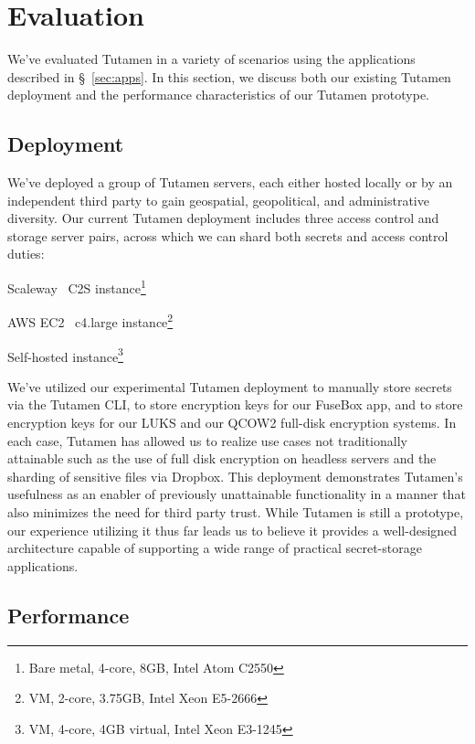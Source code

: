 \section{Evaluation}
\label{sec:eval}

We've evaluated Tutamen in a variety of scenarios using the
applications described in \S~\ref{sec:apps}. In this section, we
discuss both our existing Tutamen deployment and the performance
characteristics of our Tutamen prototype.

\subsection{Deployment}
\label{sec:eval:deployment}

We've deployed a group of Tutamen servers, each either hosted locally
or by an independent third party to gain geospatial, geopolitical, and
administrative diversity. Our current Tutamen deployment includes
three access control and storage server pairs, across which we can
shard both secrets and access control duties:

\begin{packed_desc}
\item[France:] Scaleway~\cite{scaleway} C2S instance\footnote{Bare
  metal, 4-core, 8GB, Intel Atom C2550}
\item[North Virginia:] AWS EC2~\cite{amazon-ec2} c4.large
  instance\footnote{VM, 2-core, 3.75GB, Intel Xeon E5-2666}
\item[Colorado:] Self-hosted instance\footnote{VM, 4-core, 4GB virtual,
  Intel Xeon E3-1245}
\end{packed_desc}

We've utilized our experimental Tutamen deployment to manually store
secrets via the Tutamen CLI, to store encryption keys for our FuseBox
app, and to store encryption keys for our LUKS and our QCOW2 full-disk
encryption systems. In each case, Tutamen has allowed us to realize
use cases not traditionally attainable such as the use of full disk
encryption on headless servers and the sharding of sensitive files via
Dropbox. This deployment demonstrates Tutamen's usefulness as an
enabler of previously unattainable functionality in a manner that also
minimizes the need for third party trust. While Tutamen is still a
prototype, our experience utilizing it thus far leads us to believe it
provides a well-designed architecture capable of supporting a wide
range of practical secret-storage applications.

\subsection{Performance}
\label{sec:eval:perf}

